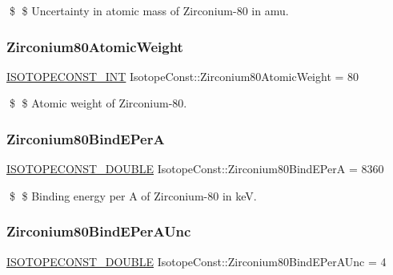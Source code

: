 \$ \$ Uncertainty in atomic mass of Zirconium-\/80 in amu. \mbox{\label{group___isotope_const-_zirconium-_zr80_ga37bcdf51862008f0669551e320387f4d}} 
\subsubsection{\texorpdfstring{Zirconium80\+Atomic\+Weight}{Zirconium80AtomicWeight}}
{\footnotesize\ttfamily \mbox{\hyperlink{group___isotope_const-_macros_ga5f18360b3e99483a35c32d789e62621c}{I\+S\+O\+T\+O\+P\+E\+C\+O\+N\+S\+T\+\_\+\+I\+NT}} Isotope\+Const\+::\+Zirconium80\+Atomic\+Weight = 80}

\$ \$ Atomic weight of Zirconium-\/80. \mbox{\label{group___isotope_const-_zirconium-_zr80_gad4a693739a562c242fdc5826d227bb8d}} 
\subsubsection{\texorpdfstring{Zirconium80\+Bind\+E\+PerA}{Zirconium80BindEPerA}}
{\footnotesize\ttfamily \mbox{\hyperlink{group___isotope_const-_macros_ga8f45a7272ce02c0b4c65c44636ed719a}{I\+S\+O\+T\+O\+P\+E\+C\+O\+N\+S\+T\+\_\+\+D\+O\+U\+B\+LE}} Isotope\+Const\+::\+Zirconium80\+Bind\+E\+PerA = 8360}

\$ \$ Binding energy per A of Zirconium-\/80 in keV. \mbox{\label{group___isotope_const-_zirconium-_zr80_gade792a0e8e89987bc2e414b1abb2d6e8}} 
\subsubsection{\texorpdfstring{Zirconium80\+Bind\+E\+Per\+A\+Unc}{Zirconium80BindEPerAUnc}}
{\footnotesize\ttfamily \mbox{\hyperlink{group___isotope_const-_macros_ga8f45a7272ce02c0b4c65c44636ed719a}{I\+S\+O\+T\+O\+P\+E\+C\+O\+N\+S\+T\+\_\+\+D\+O\+U\+B\+LE}} Isotope\+Const\+::\+Zirconium80\+Bind\+E\+Per\+A\+Unc = 4}

